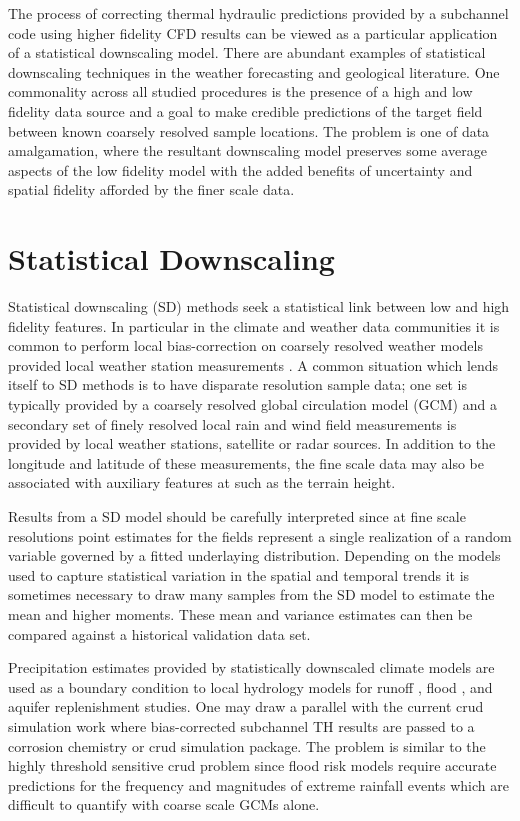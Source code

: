 
The process of correcting thermal hydraulic predictions provided by a subchannel code using higher fidelity CFD results can be viewed as a particular application of a statistical downscaling model.  There are abundant examples of statistical downscaling techniques in the weather forecasting and geological literature.  One commonality across all studied procedures is the presence of a high and low fidelity data source and a goal to make credible predictions of the target field between known coarsely resolved sample locations.  The problem is one of data amalgamation, where the resultant downscaling model preserves some average aspects of the low fidelity model with the added benefits of uncertainty and spatial fidelity afforded by the finer scale data.

\section{Statistical Downscaling}

Statistical downscaling (SD) methods seek a statistical link between low and high fidelity features.
In particular in the climate and weather data communities it is common to perform local bias-correction on coarsely resolved weather models provided local weather station measurements \cite{wilby1998} \cite{arelia2016} \cite{goly2014}. A common situation which lends itself to SD methods is to have disparate resolution sample data; one set is typically provided by a coarsely resolved global circulation model (GCM) and a secondary set of finely resolved local rain and wind field measurements is provided by local weather stations, satellite or radar sources.  In addition to the longitude and latitude of these measurements, the fine scale data may also be associated with auxiliary features at such as the terrain height.

Results from a SD model should be carefully interpreted since at fine scale resolutions point estimates for the fields represent a single realization of a random variable governed by a fitted underlaying distribution.  Depending on the models used to capture statistical variation in the spatial and temporal trends it is sometimes necessary to draw many samples from the SD model to estimate the mean and higher moments.  These mean and variance estimates can then be compared against a historical validation data set.

Precipitation estimates provided by statistically downscaled climate models are used as a boundary condition to local hydrology models for runoff \cite{wood2002}, flood \cite{hess2007}, and aquifer replenishment studies.  One may draw a parallel with the current crud simulation work where bias-corrected subchannel TH results are passed to a corrosion chemistry or crud simulation package. The problem is similar to the highly threshold sensitive crud problem since flood risk models require accurate predictions for the frequency and magnitudes of extreme rainfall events which are difficult to quantify with coarse scale GCMs alone.

